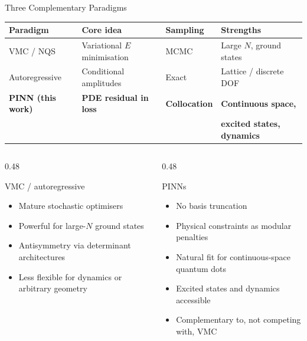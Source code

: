 \documentclass[aspectratio=169,10pt]{beamer}
\begin{document}
\begin{frame}{Three Complementary Paradigms}
  \renewcommand{\arraystretch}{1.3}
  \begin{center}
  \small
  \begin{tabular}{llll}
    \toprule
    \textbf{Paradigm} & \textbf{Core idea} & \textbf{Sampling}
      & \textbf{Strengths} \\
    \midrule
    VMC / NQS
      & Variational $E$ minimisation
      & MCMC
      & Large $N$, ground states \\
    Autoregressive
      & Conditional amplitudes
      & Exact
      & Lattice / discrete DOF \\
    \rowcolor{lightblue}
    \textbf{PINN (this work)}
      & \textbf{PDE residual in loss}
      & \textbf{Collocation}
      & \textbf{Continuous space,} \\
    \rowcolor{lightblue}
    & & & \textbf{excited states, dynamics} \\
    \bottomrule
  \end{tabular}
  \end{center}
  \medskip
  \begin{columns}[T]
    \begin{column}{0.48\textwidth}
      \begin{block}{VMC / autoregressive}
        \begin{itemize}
          \item Mature stochastic optimisers
          \item Powerful for large-$N$ ground states
          \item Antisymmetry via determinant architectures
          \item Less flexible for dynamics or arbitrary geometry
        \end{itemize}
      \end{block}
    \end{column}
    \begin{column}{0.48\textwidth}
      \begin{block}{PINNs}
        \begin{itemize}
          \item No basis truncation
          \item Physical constraints as modular penalties
          \item Natural fit for continuous-space quantum dots
          \item Excited states and dynamics accessible
          \item Complementary to, not competing with, VMC
        \end{itemize}
      \end{block}
    \end{column}
  \end{columns}
\end{frame}
\end{document}
